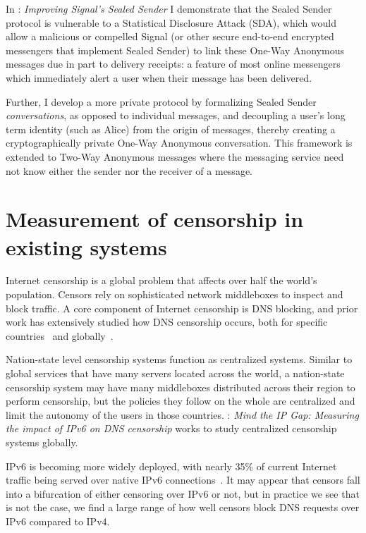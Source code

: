In : \emph{Improving Signal's Sealed Sender} I demonstrate that
the Sealed Sender protocol is vulnerable to a Statistical Disclosure Attack
(SDA), which would allow a malicious or compelled Signal (or other secure
end-to-end encrypted messengers that implement Sealed Sender) to link these
One-Way Anonymous messages due in part to delivery receipts: a feature of most
online messengers which immediately alert a user when their message has been
delivered.

Further, I develop a more private protocol by formalizing Sealed Sender
\emph{conversations}, as opposed to individual messages, and decoupling a user's
long term identity (such as Alice) from the origin of messages, thereby creating
a cryptographically private One-Way Anonymous conversation. This framework is
extended to Two-Way Anonymous messages where the messaging service need not know
either the sender nor the receiver of a message. 

\section{Measurement of censorship in existing systems}
Internet censorship is a global problem that affects over half the world's
population. Censors rely on sophisticated network middleboxes to inspect and
block traffic. A core component of Internet censorship is DNS blocking, and
prior work has extensively studied how DNS censorship occurs, both for specific
countries~\cite{Anonymous2020:TripletCensors,USESEC21:GFWatch} and
globally~\cite{kuhrer2015going,dagon2008corrupted,pearce2017global,scott2016satellite}.

Nation-state level censorship systems function as centralized systems. Similar
to global services that have many servers located across the world, a
nation-state censorship system may have many middleboxes distributed across
their region to perform censorship, but the policies they follow on the whole
are centralized and limit the autonomy of the users in those countries.
: \emph{Mind the IP Gap: Measuring the impact of IPv6 on DNS
censorship} works to study centralized censorship systems globally. 

IPv6 is becoming more widely deployed, with nearly 35\% of current Internet
traffic being served over native IPv6 connections~\cite{Google-IPv6}. It may
appear that censors fall into a bifurcation of either censoring over IPv6 or
not, but in practice we see that is not the case, we find a large range of how
well censors block DNS requests over IPv6 compared to IPv4.

